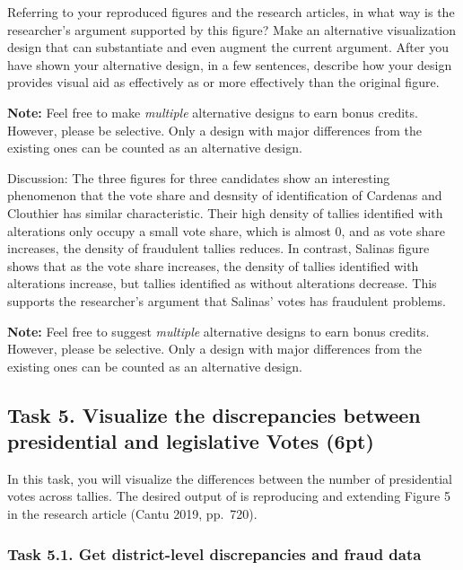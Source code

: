 \documentclass[
]{article}
\begin{document}
Referring to your reproduced figures and the research articles, in what
way is the researcher's argument supported by this figure? Make an
alternative visualization design that can substantiate and even augment
the current argument. After you have shown your alternative design, in a
few sentences, describe how your design provides visual aid as
effectively as or more effectively than the original figure.

\textbf{Note:} Feel free to make \emph{multiple} alternative designs to
earn bonus credits. However, please be selective. Only a design with
major differences from the existing ones can be counted as an
alternative design.

Discussion: The three figures for three candidates show an interesting
phenomenon that the vote share and desnsity of identification of
Cardenas and Clouthier has similar characteristic. Their high density of
tallies identified with alterations only occupy a small vote share,
which is almost 0, and as vote share increases, the density of
fraudulent tallies reduces. In contrast, Salinas figure shows that as
the vote share increases, the density of tallies identified with
alterations increase, but tallies identified as without alterations
decrease. This supports the researcher's argument that Salinas' votes
has fraudulent problems.

\textbf{Note:} Feel free to suggest \emph{multiple} alternative designs
to earn bonus credits. However, please be selective. Only a design with
major differences from the existing ones can be counted as an
alternative design.

\clearpage

\hypertarget{task-5.-visualize-the-discrepancies-between-presidential-and-legislative-votes-6pt}{%
\subsection{Task 5. Visualize the discrepancies between presidential and
legislative Votes
(6pt)}\label{task-5.-visualize-the-discrepancies-between-presidential-and-legislative-votes-6pt}}

In this task, you will visualize the differences between the number of
presidential votes across tallies. The desired output of is reproducing
and extending Figure 5 in the research article (Cantu 2019, pp.~720).

\hypertarget{task-5.1.-get-district-level-discrepancies-and-fraud-data}{%
\subsubsection{Task 5.1. Get district-level discrepancies and fraud
data}\label{task-5.1.-get-district-level-discrepancies-and-fraud-data}}
\end{document}
